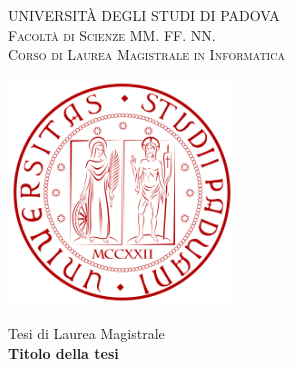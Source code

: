 
\begin{titlepage}
    \begin{center}
        {\Large UNIVERSITÀ DEGLI STUDI DI PADOVA}\\
        \vspace{0.2cm}                                                  %
        {\Large \scshape Facoltà di Scienze MM. FF. NN.}\\
        \vspace{2mm}
        {\Large \scshape Corso di Laurea Magistrale in Informatica}\\
        \vspace{2mm}                                                      %
        
        \vspace{0.3cm}
        \includegraphics[width=6cm]{figure/unipd_logo}\\
        \vspace{2cm}
        
        Tesi di Laurea Magistrale\\
        \vspace{2cm}
        {\LARGE \bfseries Titolo della tesi} \\
        \vspace{4cm}
    \end{center}


\end{titlepage}
